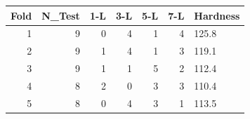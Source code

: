 \begin{tabular}{rrrrrrl}
\toprule
Fold & N_Test & 1-L & 3-L & 5-L & 7-L & Hardness \\
\midrule
1 & 9 & 0 & 4 & 1 & 4 & 125.8 \\
2 & 9 & 1 & 4 & 1 & 3 & 119.1 \\
3 & 9 & 1 & 1 & 5 & 2 & 112.4 \\
4 & 8 & 2 & 0 & 3 & 3 & 110.4 \\
5 & 8 & 0 & 4 & 3 & 1 & 113.5 \\
\bottomrule
\end{tabular}

